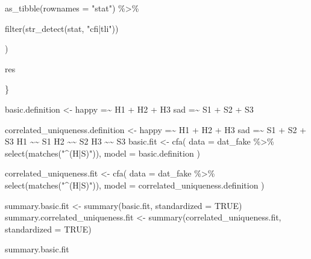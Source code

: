 \documentclass[
  letterpaper,
  DIV=11,
  numbers=noendperiod]{scrreprt}
\newenvironment{Shaded}{\begin{snugshade}}{\end{snugshade}}
\newcommand{\AttributeTok}[1]{\textcolor[rgb]{0.40,0.45,0.13}{#1}}
\newcommand{\ConstantTok}[1]{\textcolor[rgb]{0.56,0.35,0.01}{#1}}
\newcommand{\FunctionTok}[1]{\textcolor[rgb]{0.28,0.35,0.67}{#1}}
\newcommand{\NormalTok}[1]{\textcolor[rgb]{0.00,0.23,0.31}{#1}}
\newcommand{\OtherTok}[1]{\textcolor[rgb]{0.00,0.23,0.31}{#1}}
\newcommand{\SpecialCharTok}[1]{\textcolor[rgb]{0.37,0.37,0.37}{#1}}
\newcommand{\StringTok}[1]{\textcolor[rgb]{0.13,0.47,0.30}{#1}}
\begin{document}
\begin{Shaded}
\begin{Highlighting}[]
      \FunctionTok{as\_tibble}\NormalTok{(}\AttributeTok{rownames =} \StringTok{"stat"}\NormalTok{) }\SpecialCharTok{\%\textgreater{}\%} 
      
      \FunctionTok{filter}\NormalTok{(}\FunctionTok{str\_detect}\NormalTok{(stat, }\StringTok{"cfi|tli"}\NormalTok{)) }
    
\NormalTok{  )}
  
\NormalTok{  res}
  
\NormalTok{\}}
\end{Highlighting}
\end{Shaded}

\begin{Shaded}
\begin{Highlighting}[]
\NormalTok{basic.definition }\OtherTok{\textless{}{-}} 
  \StringTok{\textquotesingle{}happy =\textasciitilde{} H1 + H2 + H3}
\StringTok{   sad =\textasciitilde{} S1 + S2 + S3}
\StringTok{   \textquotesingle{}}

\NormalTok{correlated\_uniqueness.definition }\OtherTok{\textless{}{-}} 
  \StringTok{\textquotesingle{}happy =\textasciitilde{} H1 + H2 + H3}
\StringTok{   sad =\textasciitilde{} S1 + S2 + S3}
\StringTok{   }
\StringTok{   H1 \textasciitilde{}\textasciitilde{} S1}
\StringTok{   H2 \textasciitilde{}\textasciitilde{} S2}
\StringTok{   H3 \textasciitilde{}\textasciitilde{} S3}
\StringTok{   \textquotesingle{}}
\NormalTok{basic.fit }\OtherTok{\textless{}{-}} \FunctionTok{cfa}\NormalTok{(}
  \AttributeTok{data =}\NormalTok{ dat\_fake }\SpecialCharTok{\%\textgreater{}\%} \FunctionTok{select}\NormalTok{(}\FunctionTok{matches}\NormalTok{(}\StringTok{"\^{}(H|S)"}\NormalTok{)),}
  \AttributeTok{model =}\NormalTok{ basic.definition}
\NormalTok{)}

\NormalTok{correlated\_uniqueness.fit }\OtherTok{\textless{}{-}} \FunctionTok{cfa}\NormalTok{(}
  \AttributeTok{data =}\NormalTok{ dat\_fake }\SpecialCharTok{\%\textgreater{}\%} \FunctionTok{select}\NormalTok{(}\FunctionTok{matches}\NormalTok{(}\StringTok{"\^{}(H|S)"}\NormalTok{)),}
  \AttributeTok{model =}\NormalTok{ correlated\_uniqueness.definition}
\NormalTok{)}

\NormalTok{summary.basic.fit }\OtherTok{\textless{}{-}} \FunctionTok{summary}\NormalTok{(basic.fit, }\AttributeTok{standardized =} \ConstantTok{TRUE}\NormalTok{)}
\NormalTok{summary.correlated\_uniqueness.fit }\OtherTok{\textless{}{-}} \FunctionTok{summary}\NormalTok{(correlated\_uniqueness.fit, }\AttributeTok{standardized =} \ConstantTok{TRUE}\NormalTok{)}

\NormalTok{summary.basic.fit}
\end{Highlighting}
\end{Shaded}
\end{document}
